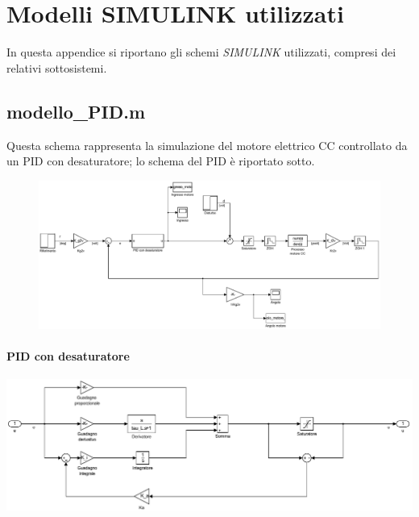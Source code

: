 \section{Modelli SIMULINK utilizzati}
\label{app:SIMULINK}

	In questa appendice si riportano gli schemi \textit{SIMULINK} utilizzati, compresi dei relativi sottosistemi.

	\subsection{modello\_PID.m}
	\label{subapp:modelloPID}
	
		Questa schema rappresenta la simulazione del motore elettrico CC controllato da un PID con desaturatore; lo schema del PID è riportato sotto.
		
		\begin{figure}[H]
			\centering
			\includegraphics[scale=0.6]{./Figure/SIMULINK/modello_PID.pdf}
		\end{figure}
		
		\paragraph{PID con desaturatore}
		
			\begin{center}
				\includegraphics[scale=0.45]{./Figure/SIMULINK/PID_desaturatore.pdf}
			\end{center}
		